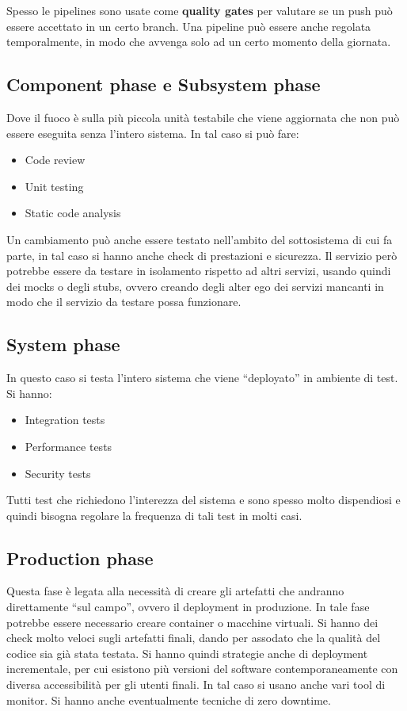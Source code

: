 Spesso le pipelines sono usate come \textbf{quality gates} per valutare se un push può essere accettato in un certo branch. Una pipeline può essere anche regolata temporalmente, in modo che avvenga solo ad un certo momento della giornata.
\subsection{Component phase e Subsystem phase}
Dove il fuoco è sulla più piccola unità testabile che viene aggiornata che non può essere eseguita senza l’intero sistema. In tal caso si può fare:
\begin{itemize}
    \item Code review
    \item Unit testing
    \item Static code analysis
\end{itemize}

Un cambiamento può anche essere testato nell’ambito del sottosistema di cui fa parte, in tal caso si hanno anche check di prestazioni e sicurezza. Il servizio però potrebbe essere da testare in isolamento rispetto ad altri servizi, usando quindi dei mocks o degli stubs, ovvero creando degli alter ego dei servizi mancanti in modo che il servizio da testare possa funzionare.
\subsection{System phase}
In questo caso si testa l’intero sistema che viene “deployato” in ambiente di test. Si hanno:
\begin{itemize}
    \item Integration tests
    \item Performance tests
    \item Security tests
\end{itemize}

Tutti test che richiedono l’interezza del sistema e sono spesso molto dispendiosi e quindi bisogna regolare la frequenza di tali test in molti casi.
\subsection{Production phase}
Questa fase è legata alla necessità di creare gli artefatti che andranno direttamente “sul campo”, ovvero il deployment in produzione. In tale fase potrebbe essere necessario creare container o macchine virtuali. Si hanno dei check molto veloci sugli artefatti finali, dando per assodato che la qualità del codice sia già stata testata. Si hanno quindi strategie anche di deployment incrementale, per cui esistono più versioni del software contemporaneamente con diversa accessibilità per gli utenti finali. In tal caso si usano anche vari tool di monitor. Si hanno anche eventualmente tecniche di zero downtime.

